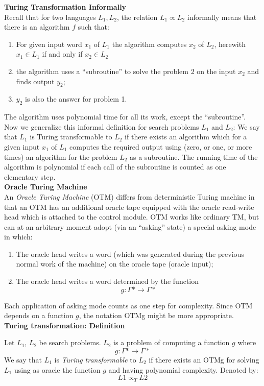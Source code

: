 \textbf{Turing Transformation Informally}\\
Recall that for two languages $L_1 , L_2$,
the relation $L_1 \propto L_2$ informally means that there is an algorithm $f$ such that:
\begin{enumerate}
    \item
        For given input word $x_1$ of $L_1$ the algorithm computes $x_2$ of $L_2$,
        herewith $x_1 \in L_1$ if and only if $x_2 \in L_2$
    \item the algorithm uses a “subroutine” to solve the problem 2 on the input $x_2$ and finds output $y_2$;
    \item $y_2$ is also the answer for problem 1.
\end{enumerate}
The algorithm uses polynomial time for all its work,
except the “subroutine”.
Now we generalize this informal definition for search problems $L_1$ and $L_2$:
We say that $L_1$ is Turing transformable to $L_2$
if there exists an algorithm which for a given input $x_1$ of $L_1$
computes the required output using (zero, or one, or more times) an algorithm
for the problem $L_2$ as a subroutine.
The running time of the algorithm is polynomial
if each call of the subroutine is counted as one elementary step.\\

\textbf{Oracle Turing Machine}\\
An \textit{Oracle Turing Machine} (OTM) differs from deterministic Turing machine
in that an OTM has an additional oracle tape equipped with the oracle read-write head
which is attached to the control module.
OTM works like ordinary TM,
but can at an arbitrary moment adopt (via an “asking” state) a special asking mode in which:
\begin{enumerate}
    \item The oracle head writes a word (which was generated during the previous normal work of the machine) on the oracle tape (oracle input);
    \item The oracle head writes a word determined by the function
        $$g: \Gamma\ast \rightarrow \Gamma\ast$$
\end{enumerate}
Each application of asking mode counts as one step for complexity.
Since OTM depends on a function $g$,
the notation OTMg might be more appropriate.\\

\textbf{Turing transformation: Definition}\\
\begin{definition}
    Let $L_1$, $L_2$ be search problems.
    $L_2$ is a problem of computing a function $g$ where
    $$g: \Gamma\ast \rightarrow \Gamma\ast$$
    We say that $L_1$ is \textit{Turing transformable} to $L_2$
    if there exists an OTMg for solving $L_1$
    using as oracle the function $g$ and having polynomial complexity.
    Denoted by:
    $$L1 \propto_T L2$$
\end{definition}

